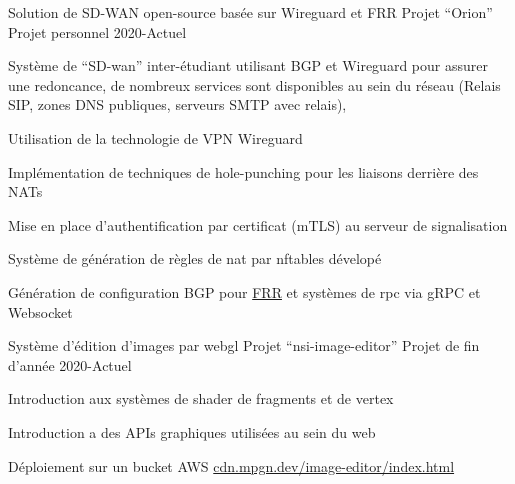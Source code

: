 
\begin{cventries}
  \cventry
    {Solution de SD-WAN open-source basée sur Wireguard et FRR}
    {Projet ``Orion'' \href{https://github.com/Orion-network-dev}{\faGithubSquare}}
    {Projet personnel}
    {2020-Actuel}
    {
      \begin{cvitems}
        \item {Système de ``SD-wan'' inter-étudiant utilisant BGP et Wireguard pour assurer une redoncance,
        de nombreux services sont disponibles au sein du réseau (Relais SIP, zones DNS publiques, serveurs SMTP avec relais), 
        }
        \item {Utilisation de la technologie de VPN Wireguard}
        \item {Implémentation de techniques de hole-punching pour les liaisons derrière des NATs}
        \item {Mise en place d'authentification par certificat (mTLS) au serveur de signalisation}
        \item {Système de génération de règles de nat par nftables dévelopé}
        \item {Génération de configuration BGP pour \href{https://github.com/FRRouting/frr.git}{FRR} et systèmes de rpc via gRPC et Websocket}
      \end{cvitems}
    }

  \cventry
    {Système d'édition d'images par webgl}
    {Projet ``nsi-image-editor'' \href{https://github.com/MatthieuCoder/nsi-image-editor}{\faGithubSquare}}
    {Projet de fin d'année}
    {2020-Actuel}
    {
      \begin{cvitems}
        \item {Introduction aux systèmes de shader de fragments et de vertex} 
        \item {Introduction a des APIs graphiques utilisées au sein du web}
        \item {Déploiement sur un bucket AWS \href{https://cdn.mpgn.dev/image-editor/index.html}{cdn.mpgn.dev/image-editor/index.html}}
      \end{cvitems}
    }


\end{cventries}
